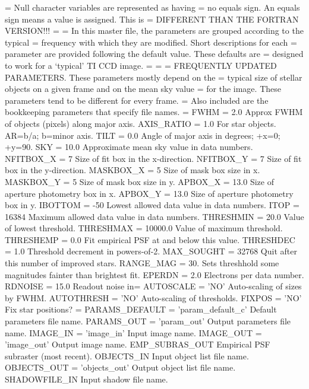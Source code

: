 {{=  Null character variables are represented as having
=  no equals sign.  An equals sign means a value is assigned. This is 
=  DIFFERENT THAN THE FORTRAN VERSION!!! 
=
=  In this master file, the parameters are grouped according to the typical 
=  frequency with which they are modified.  Short descriptions for each 
=  parameter are provided following the default value.   These defaults are 
=  designed to work for a `typical' TI CCD image.
=
=
=  FREQUENTLY UPDATED PARAMETERS.  These parameters mostly depend on the 
=  typical size of stellar objects on a given frame and on the mean sky value 
=  for the image.  These parameters tend to be different for every frame.  
=  Also included are the bookkeeping parameters that specify file names.
=
FWHM = 2.0             Approx FWHM of objects (pixels) along major axis.
AXIS\_RATIO = 1.0       For star objects.  AR=b/a; b=minor axis.
TILT = 0.0             Angle of major axis in degrees; +x=0; +y=90.
SKY = 10.0             Approximate mean sky value in data numbers.
NFITBOX\_X = 7          Size of fit box in the x-direction.
NFITBOX\_Y = 7          Size of fit box in the y-direction.
MASKBOX\_X = 5          Size of mask box size in x.
MASKBOX\_Y = 5          Size of mask box size in y.
APBOX\_X = 13.0         Size of aperture photometry box in x.
APBOX\_Y = 13.0         Size of aperture photometry box in y.
IBOTTOM = -50          Lowest allowed data value in data numbers.
ITOP = 16384           Maximum allowed data value in data numbers.
THRESHMIN = 20.0       Value of lowest threshold.
THRESHMAX = 10000.0    Value of maximum threshold.
THRESHEMP = 0.0        Fit empirical PSF at and below this value.
THRESHDEC = 1.0        Threshold decrement in powers-of-2.
MAX\_SOUGHT = 32768     Quit after this number of improved stars.
RANGE\_MAG = 30.        Sets threshhold some magnitudes fainter than brightest fit.
EPERDN = 2.0           Electrons per data number.
RDNOISE = 15.0         Readout noise in=
AUTOSCALE = 'NO'       Auto-scaling of sizes by FWHM.
AUTOTHRESH = 'NO'      Auto-scaling of thresholds.
FIXPOS = 'NO'          Fix star positions?
=
PARAMS\_DEFAULT = 'param\_default\_c'  Default parameters file name.
PARAMS\_OUT = 'param\_out'             Output parameters file name.
IMAGE\_IN = 'image\_in'                Input image name. 
IMAGE\_OUT = 'image\_out'              Output image name.
EMP\_SUBRAS\_OUT                       Empirical PSF subraster (most recent).
OBJECTS\_IN                           Input object list file name.
OBJECTS\_OUT = 'objects\_out'          Output object list file name.
SHADOWFILE\_IN                        Input shadow file name.
}}
